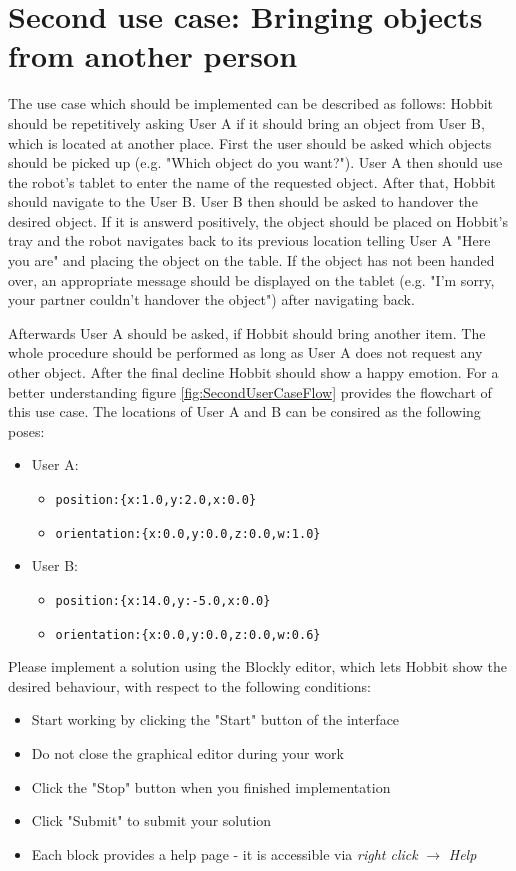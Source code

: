 \documentclass[a4paper,12pt]{article}
\begin{document}
\section*{Second use case: Bringing objects from another person}
The use case which should be implemented can be described as follows: Hobbit should be repetitively asking User A if it should bring an object from User B, which is located at another place. First the user should be asked which objects should be picked up (e.g. "Which object do you want?"). User A then should use the robot’s tablet to enter the name of the requested object. After that, Hobbit should navigate to the User B. User B then should be asked to handover the desired object. If it is answerd positively, the object should be placed on Hobbit's tray and the robot navigates back to its previous location telling User A "Here you are" and placing the object on the table. If the object has not been handed over, an appropriate message should be displayed on the tablet (e.g. "I’m sorry, your partner couldn’t handover the object") after navigating back.

Afterwards User A should be asked, if Hobbit should bring another item. The whole procedure should be performed as long as User A does not request any other object. After the final decline Hobbit should show a happy emotion. For a better understanding figure \ref{fig:SecondUserCaseFlow} provides the flowchart of this use case. The locations of User A and B can be consired as the following poses:

\begin{itemize}
    \item User A:
    \begin{itemize}
        \item \lstinline!position:{x:1.0,y:2.0,x:0.0}!
        \item \lstinline!orientation:{x:0.0,y:0.0,z:0.0,w:1.0}!
    \end{itemize}
    \item User B:
    \begin{itemize}
        \item \lstinline!position:{x:14.0,y:-5.0,x:0.0}!
        \item \lstinline!orientation:{x:0.0,y:0.0,z:0.0,w:0.6}!
    \end{itemize}
\end{itemize}

Please implement a solution using the Blockly editor, which lets Hobbit show the desired behaviour, with respect to the following conditions:
\begin{itemize}
    \item Start working by clicking the "Start" button of the interface
    \item Do not close the graphical editor during your work
    \item Click the "Stop" button when you finished implementation
    \item Click "Submit" to submit your solution
    \item Each block provides a help page - it is accessible via \textit{right click} $\rightarrow$ \textit{Help}
\end{itemize}
\end{document}
